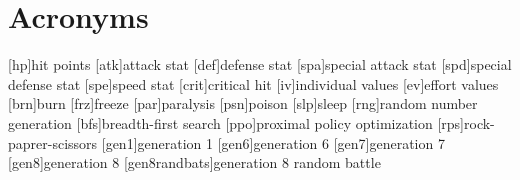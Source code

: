 
\chapter*{Acronyms}

\begin{acronym}
	[hp]{hit points}
	[atk]{attack stat}
	[def]{defense stat}
	[spa]{special attack stat}
	[spd]{special defense stat}
	[spe]{speed stat}
	[crit]{critical hit}
	[iv]{individual values}
	[ev]{effort values}
	[brn]{burn}
	[frz]{freeze}
	[par]{paralysis}
	[psn]{poison}
	[slp]{sleep}
	[rng]{random number generation}
	[bfs]{breadth-first search}
	[ppo]{proximal policy optimization}
	[rps]{rock-paprer-scissors}
	[gen1]{generation 1}
	[gen6]{generation 6}
	[gen7]{generation 7}
	[gen8]{generation 8}
	[gen8randbats]{generation 8 random battle}
\end{acronym}